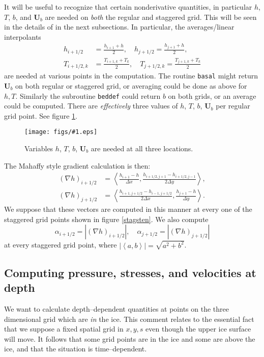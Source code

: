 \documentclass[12pt,final]{amsart}%
\theoremstyle{plain}
\theoremstyle{definition}
\theoremstyle{remark}
\newcommand{\regfigure}[2]{\texttt{[image: figs/\#1.eps]}}
\newcommand{\mtt}{\texttt}
\newcommand{\grad}{\nabla}
\newcommand{\ip}[2]{\ensuremath{\left<#1,#2\right>}}
\newcommand{\bU}{{\mathbf{U}}}
\begin{document}
It will be useful to recognize that certain nonderivative quantities, in particular $h$, $T$, $b$, and $\bU_b$ are needed on \emph{both} the regular and staggered grid.  This will be seen in the details of in the next subsections.  In particular, the averages/linear interpolants
\begin{align}
h_{i+1/2}&=\frac{h_{i+1}+h}{2}, \quad h_{j+1/2}=\frac{h_{j+1}+h}{2}, \\
T_{i+1/2,k}&=\frac{T_{i+1,k}+T_k}{2}, \quad T_{j+1/2,k}=\frac{T_{j+1,k}+T_k}{2}\end{align}
are needed at various points in the computation.  The routine \mtt{basal} might return $\bU_b$ on both regular or staggered grid, or averaging could be done as above for $h,T$.  Similarly the subroutine \mtt{beddef} could return $b$ on both grids, or an average could be computed.  There are \emph{effectively} three values of $h$, $T$, $b$, $\bU_b$ per regular grid point.  See figure \ref{molecule}.

\begin{figure}[ht]
\regfigure{molecule}{1.75}
\vspace{-5mm}
\caption{Variables $h$, $T$, $b$, $\bU_b$ are needed at all three locations.}
\label{molecule}
\end{figure}

The Mahaffy style gradient calculation is then:
\begin{align}
(\grad h)_{i+1/2} &= \ip{\frac{h_{i+1}-h}{\Delta x}}{\frac{h_{i+1/2,j+1}-h_{i+1/2,j-1}}{2\Delta y}}, \\
(\grad h)_{j+1/2} &= \ip{\frac{h_{i+1,j+1/2}-h_{i-1,j+1/2}}{2\Delta x}}{\frac{h_{j+1}-h}{\Delta y}}.
\end{align}
We suppose that these vectors are computed in this manner at every one of the staggered grid points shown in figure \ref{stagsten}.  We also compute
\begin{equation}
  \alpha_{i+1/2} = |(\grad h)_{i+1/2}|, \quad \alpha_{j+1/2} = |(\grad h)_{j+1/2}|
\end{equation}
at every staggered grid point, where $|\ip{a}{b}|=\sqrt{a^2+b^2}$.


\subsection*{Computing pressure, stresses, and velocities at depth}\label{atdepthsubsect}  We want to calculate depth--dependent quantities at points on the three dimensional grid which are \emph{in} the ice.  This comment relates to the essential fact that we suppose a fixed spatial grid in $x,y,s$ even though the upper ice surface will move.  It follows that some grid points are in the ice and some are above the ice, and that the situation is time--dependent.
\end{document}
